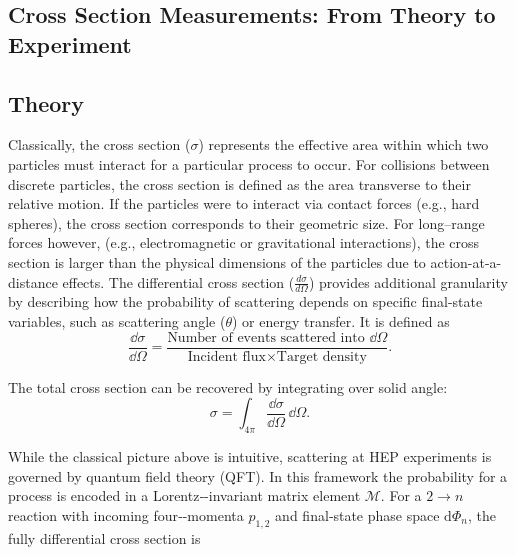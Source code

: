 \begin{definition}
\section{Cross Section Measurements: From Theory to Experiment}
\subsection{Theory}
    Classically, the cross section (\(\sigma\)) represents the effective area within which two particles must interact for a particular process to occur.
%
For collisions between discrete particles, the cross section is defined as the area transverse to their relative motion.
%
If the particles were to interact via contact forces (e.g., hard spheres), the cross section corresponds to their geometric size.
%
For long--range forces however, (e.g., electromagnetic or gravitational interactions), the cross section is larger than the physical dimensions of the particles due to action-at-a-distance effects.
%
The differential cross section (\(\frac{d\sigma}{d\Omega}\)) provides additional granularity by describing how the probability of scattering depends on specific final-state variables, such as scattering angle (\(\theta\)) or energy transfer. It is defined as
\begin{equation}
    \frac{\dd\sigma}{\dd\Omega} = \frac{\text{Number of events scattered into } \dd\Omega}{\text{Incident flux} \times \text{Target density}}.
\end{equation}

The total cross section can be recovered by integrating over solid angle:
\begin{equation}
\sigma = \int_{4\pi} \frac{\dd\sigma}{\dd\Omega} \, \dd\Omega.
\end{equation}

    While the classical picture above is intuitive, scattering at HEP experiments is governed by quantum field theory (QFT).
    In this framework the probability for a process is encoded in a Lorentz‑-invariant matrix element \(\mathcal{M}\).
    For a \(2 \to n\) reaction with incoming four‑-momenta \(p_{1,2}\) and final‑state phase space \( \text{d}\Phi_n \), the fully differential cross section is


\end{definition}
